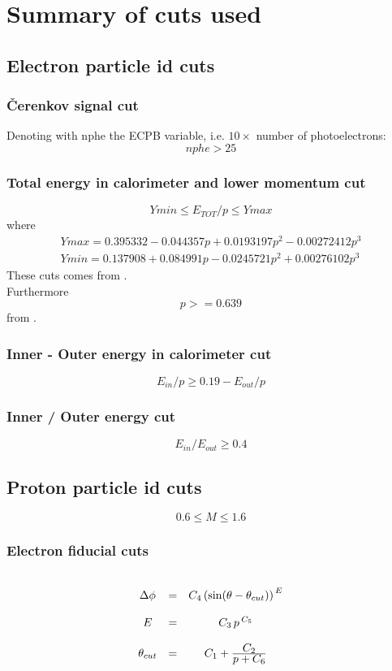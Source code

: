 

\chapter{Summary of cuts used}
\section{Electron particle id cuts}

\subsection{\v Cerenkov signal cut}
Denoting with nphe the ECPB variable, i.e. $10 \times $ number of photoelectrons:
$$nphe > 25$$




\subsection{ Total energy in calorimeter and lower momentum cut }\label{sec:ectotvsp}

$$ Ymin \le E_{TOT}/p \le Ymax $$ 
where
$$
\begin{array}{c}
Ymax = 0.395332 - 0.044357 p + 0.0193197 p^2 - 0.00272412 p^3
\\
Ymin = 0.137908 + 0.084991 p - 0.0245721 p^2 + 0.00276102 p^3 
\end{array}
$$
These cuts comes from \cite{bib:valeri1}. \\
Furthermore
$$ p >= 0.639 $$
from \cite{bib:ecmin}.




\subsection{Inner - Outer energy in calorimeter cut}
$$
E_{in}/p \ge 0.19 - E_{out}/p
$$

\subsection{Inner / Outer energy cut}
$$
E_{in}/E_{out} \ge 0.4
$$

\section{Proton particle id cuts}

$$ 0.6 \le M\le 1.6 $$


\subsection{Electron fiducial cuts}\label{app:fidu_e}
$$
\begin{array}{c c c}
\\
\Delta\phi   & = &  C_4 \left( \sin (\theta - \theta_{cut}) \right) ^{\,E} \\
\\
E        & = &  C_3\, p\, ^{C_5} \\
\\
\theta_{cut} & = &  C_1 + \frac{\displaystyle C_2}{\displaystyle p + C_6}
\end{array}
$$

